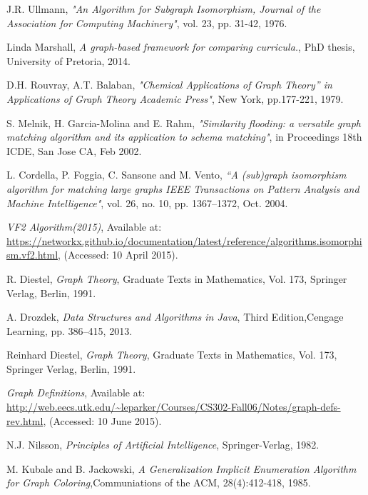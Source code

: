 
 \begin{thebibliography}{19}

	J.R. Ullmann, 
	\emph{"An Algorithm for Subgraph Isomorphism, Journal of the Association for Computing Machinery"},
	vol. 23, pp. 31-42, 1976.
	
	Linda Marshall,
	\emph{A graph-based framework for comparing curricula.},
	PhD thesis, University of Pretoria, 2014.

	D.H. Rouvray, A.T. Balaban, 
	\emph{"Chemical Applications of Graph Theory” in Applications of Graph Theory Academic Press"},
	New York, pp.177-221, 1979.

	S. Melnik, H. Garcia-Molina and E. Rahm, 
	\emph{"Similarity flooding: a versatile graph matching algorithm and its application to schema matching"},
	in Proceedings 18th ICDE, San Jose
	CA, Feb 2002.
	
	L. Cordella, P. Foggia, C. Sansone and M. Vento, 
	\emph{“A (sub)graph isomorphism algorithm for matching large graphs IEEE Transactions on Pattern Analysis and Machine Intelligence"},
	vol. 26, no. 10, pp. 1367–1372, Oct. 2004.

	\emph{VF2 Algorithm(2015)},
	Available at: \url{https://networkx.github.io/documentation/latest/reference/algorithms.isomorphism.vf2.html},
	(Accessed: 10 April 2015).
	
	R. Diestel, 
	\emph{Graph Theory},
	Graduate Texts in Mathematics,
	Vol. 173, Springer Verlag, Berlin, 1991.

	A. Drozdek, 
	\emph{Data Structures and Algorithms in Java},
	Third Edition,Cengage Learning, pp. 386–415, 2013.	

	Reinhard Diestel, 
	\emph{Graph Theory},
	Graduate Texts in Mathematics,
	Vol. 173, Springer Verlag, Berlin, 1991.

	\emph{Graph Definitions},
	Available at: \url{http://web.eecs.utk.edu/~leparker/Courses/CS302-Fall06/Notes/graph-defs-rev.html},
	(Accessed: 10 June 2015).

	N.J. Nilsson, 
	\emph{Principles of Artificial Intelligence},
	Springer-Verlag, 1982.	

	M. Kubale and B. Jackowski, 
	\emph{A Generalization Implicit Enumeration Algorithm for Graph Coloring},Communiations of the ACM, 28(4):412-418, 1985.


\end{thebibliography}
